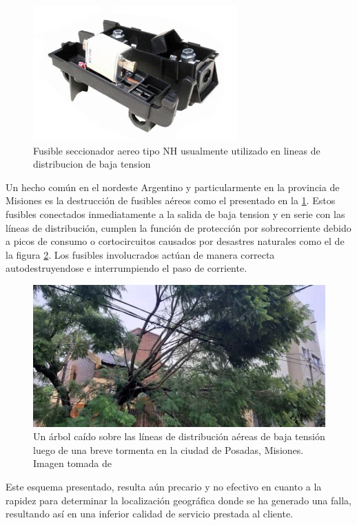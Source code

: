 \begin{figure}[h!]
	\centering
	\includegraphics[width=0.7\linewidth]{Figures/NH_aereo_bt}
	\caption{Fusible seccionador aereo tipo NH usualmente utilizado en lineas de distribucion de baja tension}
	\label{fig:nh_aereo_bt}
\end{figure}
Un hecho común en el nordeste Argentino y particularmente en la provincia de Misiones es la destrucción de fusibles aéreos como el presentado en la \ref{fig:nh_aereo_bt}. Estos fusibles conectados inmediatamente a la salida de baja tension y en serie con las líneas de distribución, cumplen la función de protección por sobrecorriente debido a picos de consumo o cortocircuitos causados por desastres naturales como el de la figura \ref{fig:arbolcaidolineabt}. Los fusibles involucrados actúan de manera correcta autodestruyendose e interrumpiendo el paso de corriente.\\
\begin{figure}[h!]
	\centering
	\includegraphics[width=0.7\linewidth]{Figures/arbol_caido_linea_bt}
	\caption{Un árbol caído sobre las líneas de distribución aéreas de baja tensión luego de una breve tormenta en la ciudad de Posadas, Misiones. Imagen tomada de \citep{Noticia_MNES}}
	\label{fig:arbolcaidolineabt}
\end{figure}
Este esquema presentado, resulta aún precario y no efectivo en cuanto a la rapidez para determinar la localización geográfica donde se ha generado una falla, resultando así en una inferior calidad de servicio prestada al cliente.\\

